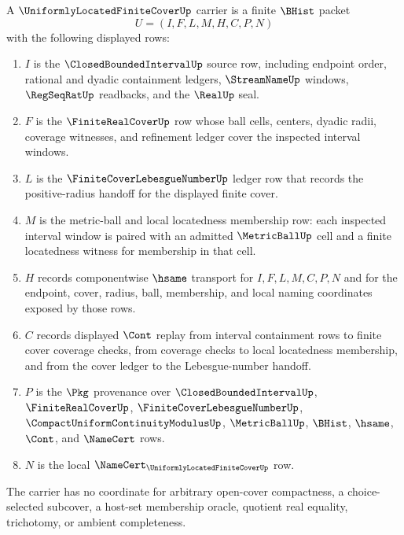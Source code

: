 \begin{definition}
\label{def:uniformly-located-finite-cover-carrier}
A $\UniformlyLocatedFiniteCoverUp$ carrier is a finite $\BHist$ packet
$$
U=(I,F,L,M,H,C,P,N)
$$
with the following displayed rows:
\begin{enumerate}
\item $I$ is the $\ClosedBoundedIntervalUp$ source row, including endpoint order, rational and dyadic containment ledgers, $\StreamNameUp$ windows, $\RegSeqRatUp$ readbacks, and the $\RealUp$ seal.
\item $F$ is the $\FiniteRealCoverUp$ row whose ball cells, centers, dyadic radii, coverage witnesses, and refinement ledger cover the inspected interval windows.
\item $L$ is the $\FiniteCoverLebesgueNumberUp$ ledger row that records the positive-radius handoff for the displayed finite cover.
\item $M$ is the metric-ball and local locatedness membership row: each inspected interval window is paired with an admitted $\MetricBallUp$ cell and a finite locatedness witness for membership in that cell.
\item $H$ records componentwise $\hsame$ transport for $I,F,L,M,C,P,N$ and for the endpoint, cover, radius, ball, membership, and local naming coordinates exposed by those rows.
\item $C$ records displayed $\Cont$ replay from interval containment rows to finite cover coverage checks, from coverage checks to local locatedness membership, and from the cover ledger to the Lebesgue-number handoff.
\item $P$ is the $\Pkg$ provenance over $\ClosedBoundedIntervalUp$, $\FiniteRealCoverUp$, $\FiniteCoverLebesgueNumberUp$, $\CompactUniformContinuityModulusUp$, $\MetricBallUp$, $\BHist$, $\hsame$, $\Cont$, and $\NameCert$ rows.
\item $N$ is the local $\NameCert_{\UniformlyLocatedFiniteCoverUp}$ row.
\end{enumerate}
The carrier has no coordinate for arbitrary open-cover compactness, a choice-selected subcover, a host-set membership oracle, quotient real equality, trichotomy, or ambient completeness.
\end{definition}

